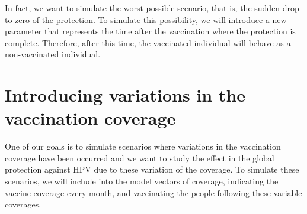 In fact, we want to simulate the worst possible scenario, that is, the sudden drop to zero of the protection. To simulate this possibility, we will introduce a new parameter that represents the time after the vaccination where the protection is complete. Therefore, after this time, the vaccinated individual will behave as a non-vaccinated individual.

\section{Introducing variations in the vaccination coverage}
One of our goals is to simulate scenarios where variations in the vaccination coverage have been occurred and we want to study the effect in the global protection against HPV due to these variation of the coverage. To simulate these scenarios, we will include into the model vectors of coverage, indicating the vaccine coverage every month, and vaccinating the people following these variable coverages. 
